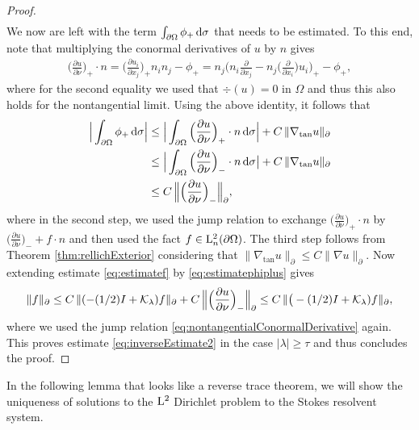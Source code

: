 \begin{proof}
\begin{align}
  \end{align}
  We now are left with the term $\int_{\partial\Omega} \phi_+ \, {\operatorname{d}\!{\sigma}}$ that needs to be estimated.
  To this end, note that multiplying the conormal derivatives of $u$ by $n$ gives
  \begin{align*}
    \Big( \frac{\partial u}{\partial \nu} \Big)_+ \cdot n
    = \Big( \frac{\partial u_i}{\partial x_j}\Big)_+ n_i n_j - \phi_+
    = n_j \Big( n_i \frac{\partial}{\partial x_j} - n_j \Big( \frac{\partial}{\partial x_i} \Big) u_i \Big)_+ - \phi_+,
  \end{align*}
  where for the second equality we used that $\div(u) = 0$ in $\Omega$ and thus this also holds for the nontangential limit.
  Using the above identity, it follows that
  \begin{align}
    \Big| \int_{\partial\Omega} \phi_+ \, {\operatorname{d}\!{\sigma}} \Big|
    &\leq \Big| \int_{\partial\Omega} \Big( \frac{\partial u}{\partial \nu} \Big)_+ \cdot n \, {\operatorname{d}\!{\sigma}} \Big|  + C\, \|\nabla_{\mathrm{tan}} u \|_{\partial} \nonumber\\
    &\leq \Big| \int_{\partial\Omega} \Big( \frac{\partial u}{\partial \nu} \Big)_- \cdot n \, {\operatorname{d}\!{\sigma}} \big| + C\, \| \nabla_{\mathrm{tan}} u\|_\partial \nonumber\\
    \label{eq:estimatephiplus}
    &\leq C\, \Big\| \Big( \frac{\partial u}{\partial \nu} \Big)_- \Big\|_\partial,
  \end{align}
  where in the second step, we used the jump relation to exchange $\big(\frac{\partial u}{\partial \nu}\big)_+ \cdot n$ by $\big(\frac{\partial u}{\partial \nu} \big)_- + f \cdot n$ and then used the fact $f \in \mathrm{L}^2_n(\partial\Omega)$.
  The third step follows from Theorem \ref{thm:rellichExterior} considering that $\|\nabla_{\mathrm{tan}} u \|_\partial \leq C \|\nabla u \|_{\partial}$.
  Now extending estimate \eqref{eq:estimatef} by \eqref{eq:estimatephiplus} gives
  \begin{align*}
    \| f\|_\partial 
    \leq C \, \| ( - (1/2) I + \mathcal{K}_\lambda) f \|_\partial + C\, \Big\| \Big(\frac{\partial u}{\partial \nu} \Big)_- \Big\|_\partial 
    \leq C \, \| \big( - (1/2) I + \mathcal{K}_\lambda) f\|_{\partial},
  \end{align*}
  where we used the jump relation \eqref{eq:nontangentialConormalDerivative} again.
  This proves estimate \eqref{eq:inverseEstimate2} in the case $|\lambda| \geq \tau$ and thus concludes the proof.
\end{proof}

In the following lemma that looks like a reverse trace theorem, we will show the uniqueness of solutions to the $\mathrm{L}^2$ Dirichlet problem to the Stokes resolvent system.

